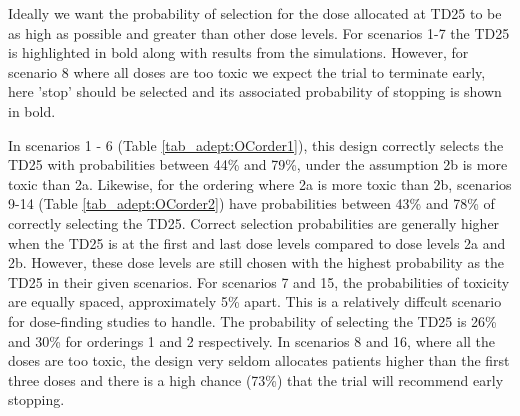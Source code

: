 Ideally we want the probability of selection for the dose allocated at TD25 to be as high as possible and greater than other dose levels. For scenarios 1-7 the TD25 is highlighted in bold along with results from the simulations. However, for scenario 8 where all doses are too toxic we expect the trial to terminate early, here 'stop' should be selected and its associated probability of stopping is shown in bold. 

In scenarios 1 - 6 (Table \ref{tab_adept:OCorder1}), this design correctly selects the TD25 with probabilities between 44\% and 79\%, under the assumption 2b is more toxic than 2a. Likewise, for the ordering where 2a is more toxic than 2b, scenarios 9-14 (Table \ref{tab_adept:OCorder2}) have probabilities between 43\% and 78\% of correctly selecting the TD25. Correct selection probabilities are generally higher when the TD25 is at the first and last dose levels compared to dose levels 2a and 2b. However, these dose levels are still chosen with the highest probability as the TD25 in their given scenarios. For scenarios 7 and 15, the probabilities of toxicity are equally spaced, approximately 5\% apart. This is a relatively diffcult scenario for dose-finding studies to handle. The probability of selecting the TD25 is 26\% and 30\% for orderings 1 and 2 respectively. In scenarios 8 and 16, where all the doses are too toxic, the design very seldom allocates patients higher than the first three doses and there is a high chance (73\%) that the trial will recommend early stopping.




